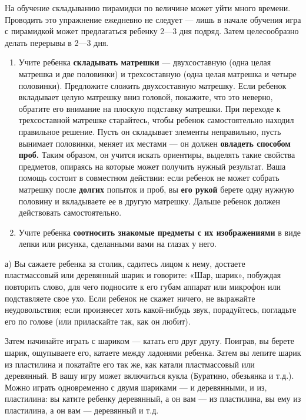 \documentclass{book}
\begin{document}
На обучение складыванию пирамидки по величине может уйти много времени.
Проводить это упражнение ежедневно не следует --- лишь в начале обучения
игра с пирамидкой может предлагаться ребенку 2---3 дня подряд. Затем
целесообразно делать перерывы в 2---3 дня.


\begin{enumerate}
\def\labelenumi{\arabic{enumi}.}
\setcounter{enumi}{1}
\item
  
  Учите ребенка \textbf{складывать матрешки} --- двухсоставную (одна
  целая матрешка и две половинки) и трехсоставную (одна целая матрешка и
  четыре половинки). Предложите сложить двухсоставную матрешку. Если
  ребенок вкладывает целую матрешку вниз головой, покажите, что это
  неверно, обратите его внимание на плоскую подставку матрешки. При
  переходе к трехсоставной матрешке старайтесь, чтобы ребенок
  самостоятельно находил правильное решение. Пусть он складывает
  элементы неправильно, пусть вынимает половинки, меняет их местами ---
  он должен \textbf{овладеть способом проб.} Таким образом, он учится
  искать ориентиры, выделять такие свойства предметов, опираясь на
  которые может получить нужный результат. Ваша помощь состоит в
  совместном действии: если ребенок не может собрать матрешку после
  \textbf{долгих} попыток и проб, вы \textbf{его рукой} берете одну
  нужную половину и вкладываете ее в другую матрешку. Дальше ребенок
  должен действовать самостоятельно.
  
\item
  
  Учите ребенка \textbf{соотносить знакомые предметы с их изображениями}
  в виде лепки или рисунка, сделанными вами на глазах у него.
  
\end{enumerate}


а) Вы сажаете ребенка за столик, садитесь лицом к нему, достаете
пластмассовый или деревянный шарик и говорите: «Шар, шарик», побуждая
повторить слово, для чего подносите к его губам аппарат или микрофон или
подставляете свое ухо. Если ребенок не скажет ничего, не выражайте
неудовольствия; если произнесет хоть какой-нибудь звук, порадуйтесь,
погладьте его по голове (или приласкайте так, как он любит).

Затем начинайте играть с шариком --- катать его друг другу. Поиграв, вы
берете шарик, ощупываете его, катаете между ладонями ребенка. Затем вы
лепите шарик из пластилина и покатайте его так же, как катали
пластмассовый или деревянный. В вашу игру может включиться кукла
(Буратино, обезьянка и т.д.). Можно играть одновременно с двумя шариками
--- и деревянными, и из, пластилина: вы катите ребенку деревянный, а он
вам --- из пластилина, вы ему из пластилина, а он вам --- деревянный и
т.д.
\end{document}
